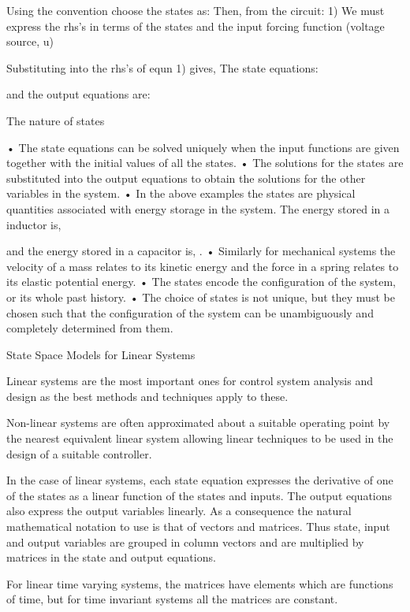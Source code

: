 Using the convention     choose the states as:   
Then, from the circuit:
    1)
We must express the rhs’s in terms of the states and the input forcing function (voltage source, u)

 
 

Substituting into the rhs’s of equn 1) gives,
The state equations:
 
and the output equations are:
 
 
The nature of states

•	The state equations can be solved uniquely when the input functions are given together with the initial values of all the states.
•	The solutions for the states are substituted into the output equations to obtain the solutions for the other variables in the system.
•	In the above examples the states are physical quantities associated with energy storage in the system. The energy stored in a inductor is,
 
   and the energy stored in a capacitor is,
 .
•	Similarly for mechanical systems the velocity of a mass relates to its kinetic energy and the force in a spring relates to its elastic potential energy.
•	The states encode the configuration of the system, or its whole past history.
•	The choice of states is not unique, but they must be chosen such that the configuration of the system can be unambiguously and completely determined from them.
 
State Space Models for Linear Systems

Linear systems are the most important ones for control system analysis and design as the best methods and techniques apply to these.

Non-linear systems are often approximated about a suitable operating point by the nearest equivalent linear system allowing linear techniques to be used in the design of a suitable controller.

In the case of linear systems, each state equation expresses the derivative of one of the states as a linear function of the states and inputs. The output equations also express the output variables linearly. As a consequence the natural mathematical notation to use is that of vectors and matrices.
Thus state, input and output variables are grouped in column vectors and are multiplied by matrices in the state and output equations.

For linear time varying systems, the matrices have elements which are functions of time, but for time invariant systems all the matrices are constant.


\endinput

